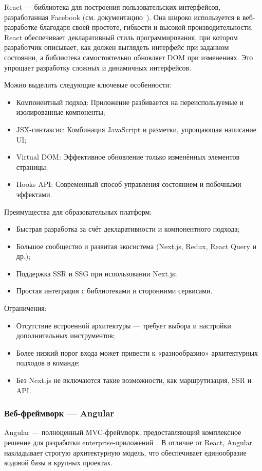 React — библиотека для построения пользовательских интерфейсов, разработанная Facebook (см. документацию~\cite{react_getting_started}). Она широко используется в веб-разработке благодаря своей простоте, гибкости и высокой производительности. React обеспечивает декларативный стиль программирования, при котором разработчик описывает, как должен выглядеть интерфейс при заданном состоянии, а библиотека самостоятельно обновляет DOM при изменениях. Это упрощает разработку сложных и динамичных интерфейсов.

Можно выделить следующие ключевые особенности:
\begin{itemize}
  \item Компонентный подход: Приложение разбивается на переиспользуемые и изолированные компоненты;
  \item JSX-синтаксис: Комбинация JavaScript и разметки, упрощающая написание UI;
  \item Virtual DOM: Эффективное обновление только изменённых элементов страницы;
  \item Hooks API: Современный способ управления состоянием и побочными эффектами.
\end{itemize}

Преимущества для образовательных платформ:
\begin{itemize}
  \item Быстрая разработка за счёт декларативности и компонентного подхода;
  \item Большое сообщество и развитая экосистема (Next.js, Redux, React Query и др.);
  \item Поддержка SSR и SSG при использовании Next.js;
  \item Простая интеграция с библиотеками и сторонними сервисами.
\end{itemize}

Ограничения:
\begin{itemize}
  \item Отсутствие встроенной архитектуры — требует выбора и настройки дополнительных инструментов;
  \item Более низкий порог входа может привести к «разнообразию» архитектурных подходов в команде;
  \item Без Next.js не включаются такие возможности, как маршрутизация, SSR и API.
\end{itemize}

\subsubsection{Веб-фреймворк — Angular}
Angular — полноценный MVC-фреймворк, предоставляющий комплексное решение для разработки enterprise-приложений~\cite{angular_overview}. В отличие от React, Angular накладывает строгую архитектурную модель, что обеспечивает единообразие кодовой базы в крупных проектах.


